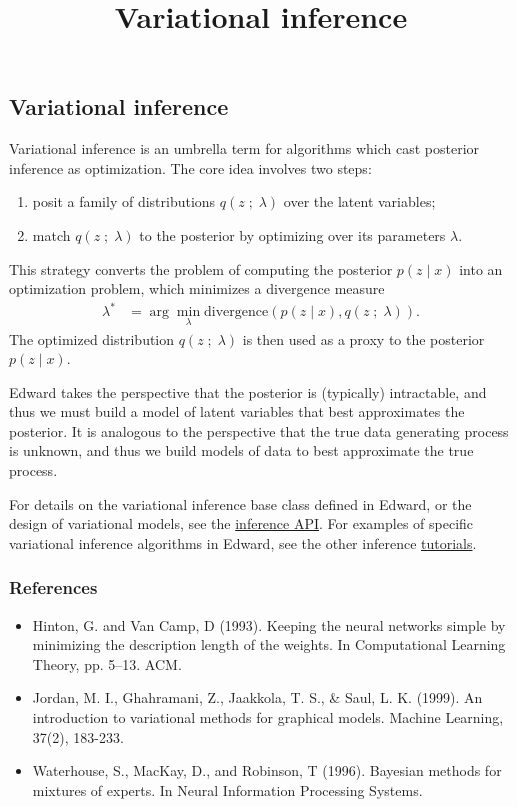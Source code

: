 \title{Variational inference}

\subsection{Variational inference}

Variational inference is an umbrella term for algorithms which cast
posterior inference as optimization. The core idea involves two steps:
\begin{enumerate}
   \item posit a family of distributions $q(z\;;\;\lambda)$ over the
   latent variables;
   \item match $q(z\;;\;\lambda)$ to the posterior by optimizing over its
   parameters $\lambda$.
 \end{enumerate}
This strategy converts the problem of computing the posterior $p(z \mid x)$ into
an optimization problem, which minimizes a divergence measure
\begin{align*}
  \lambda^*
  &=
  \arg\min_\lambda \text{divergence}(
  p(z \mid x)
  ,
  q(z\;;\;\lambda)
  ).
\end{align*}
The optimized distribution $q(z\;;\;\lambda)$ is then used as a
proxy to the posterior $p(z\mid x)$.

Edward takes the perspective that the posterior is (typically)
intractable, and thus we must build a model of latent variables that
best approximates the posterior.
It is analogous to the perspective
that the true data generating process is unknown, and thus we build
models of data to best approximate the true process.

For details on the variational inference base class defined in Edward,
or the design of variational models, see the
\href{api/inferences}{inference API}.
For examples of specific variational inference algorithms in
Edward, see the other inference \href{tutorials}{tutorials}.

\subsubsection{References}\label{references}

\begin{itemize}
\item
  Hinton, G. and Van Camp, D (1993). Keeping the neural networks
  simple by minimizing the description length of the weights. In
  Computational Learning Theory, pp. 5–13. ACM.
\item
  Jordan, M. I., Ghahramani, Z., Jaakkola, T. S., & Saul, L. K.
  (1999). An introduction to variational methods for graphical models.
  Machine Learning, 37(2), 183-233.
\item
  Waterhouse, S., MacKay, D., and Robinson, T (1996). Bayesian methods
  for mixtures of experts. In Neural Information Processing Systems.
\end{itemize}
